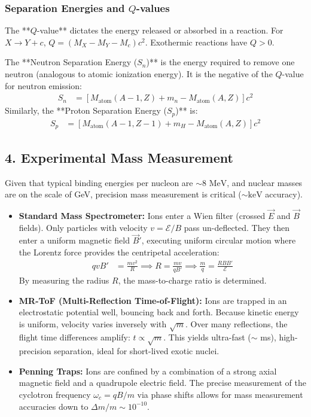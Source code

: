 \subsubsection*{Separation Energies and $Q$-values}
The **$Q$-value** dictates the energy released or absorbed in a reaction. For $X \rightarrow Y + c$, $Q = (M_X - M_Y - M_c)c^2$. Exothermic reactions have $Q > 0$.

The **Neutron Separation Energy ($S_n$)** is the energy required to remove one neutron (analogous to atomic ionization energy). It is the negative of the $Q$-value for neutron emission:
\begin{align*}
S_n &= \left[ M_{\text{atom}}(A-1, Z) + m_n - M_{\text{atom}}(A, Z) \right] c^2
\end{align*}
Similarly, the **Proton Separation Energy ($S_p$)** is:
\begin{align*}
S_p &= \left[ M_{\text{atom}}(A-1, Z-1) + m_H - M_{\text{atom}}(A, Z) \right] c^2
\end{align*}

\subsection*{4. Experimental Mass Measurement}
Given that typical binding energies per nucleon are $\sim 8 \text{ MeV}$, and nuclear masses are on the scale of GeV, precision mass measurement is critical ($\sim \text{keV}$ accuracy).
\begin{itemize}
    \item \textbf{Standard Mass Spectrometer:} Ions enter a Wien filter (crossed $\vec{E}$ and $\vec{B}$ fields). Only particles with velocity $v = \mathcal{E}/B$ pass un-deflected. They then enter a uniform magnetic field $\vec{B}'$, executing uniform circular motion where the Lorentz force provides the centripetal acceleration:
    \begin{align*}
    q v B' &= \frac{m v^2}{R} \implies R = \frac{m v}{q B'} \implies \frac{m}{q} = \frac{R B B'}{\mathcal{E}}
    \end{align*}
    By measuring the radius $R$, the mass-to-charge ratio is determined.
    \item \textbf{MR-ToF (Multi-Reflection Time-of-Flight):} Ions are trapped in an electrostatic potential well, bouncing back and forth. Because kinetic energy is uniform, velocity varies inversely with $\sqrt{m}$. Over many reflections, the flight time differences amplify: $t \propto \sqrt{m}$. This yields ultra-fast ($\sim$ ms), high-precision separation, ideal for short-lived exotic nuclei.
    \item \textbf{Penning Traps:} Ions are confined by a combination of a strong axial magnetic field and a quadrupole electric field. The precise measurement of the cyclotron frequency $\omega_c = qB/m$ via phase shifts allows for mass measurement accuracies down to $\Delta m / m \sim 10^{-10}$.
\end{itemize}

